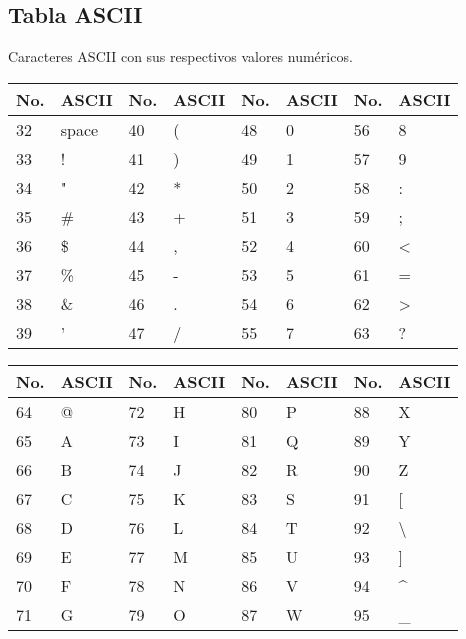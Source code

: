 \documentclass[10pt,landscape,twocolumn,letterpaper,twosided]{article}
\begin{document}
{{		\subsection{Tabla ASCII}
			Caracteres ASCII con sus respectivos valores numéricos.
			\begin{table}[H]
				\begin{tabular}{|l|l|l|l|l|l|l|l|}
					\hline \textbf{No.} & \textbf{ASCII} & \textbf{No.} & \textbf{ASCII}  &
						\textbf{No.} & \textbf{ASCII} & \textbf{No.} & \textbf{ASCII} \\ \hline
					32 & space & 40 & ( & 48 & 0 & 56 & 8 \\ \hline
					33 &  ! & 41 & ) & 49 & 1 & 57 & 9 \\ \hline
					34 &  " & 42 & * & 50 & 2 & 58 & : \\ \hline
					35 & \# & 43 & + & 51 & 3 & 59 & ; \\ \hline
					36 & \$ & 44 & , & 52 & 4 & 60 & < \\ \hline
					37 & \% & 45 & - & 53 & 5 & 61 & = \\ \hline
					38 & \& & 46 & . & 54 & 6 & 62 & > \\ \hline
					39 &  ' & 47 & / & 55 & 7 & 63 & ? \\ \hline
				\end{tabular}
			\end{table}
		
			\begin{tabular}{|l|l|l|l|l|l|l|l|}
				\hline \textbf{No.} & \textbf{ASCII} & \textbf{No.} & \textbf{ASCII}  &
					\textbf{No.} & \textbf{ASCII} & \textbf{No.} & \textbf{ASCII} \\ \hline
				64 & @ & 72 & H & 80 & P & 88 & X \\ \hline
				65 & A & 73 & I & 81 & Q & 89 & Y \\ \hline
				66 & B & 74 & J & 82 & R & 90 & Z \\ \hline
				67 & C & 75 & K & 83 & S & 91 & [ \\ \hline
				68 & D & 76 & L & 84 & T & 92 & \textbackslash \\ \hline
				69 & E & 77 & M & 85 & U & 93 & ] \\ \hline
				70 & F & 78 & N & 86 & V & 94 & \textasciicircum \\ \hline
				71 & G & 79 & O & 87 & W & 95 & \_ \\ \hline
			\end{tabular}
		
}}
\end{document}
